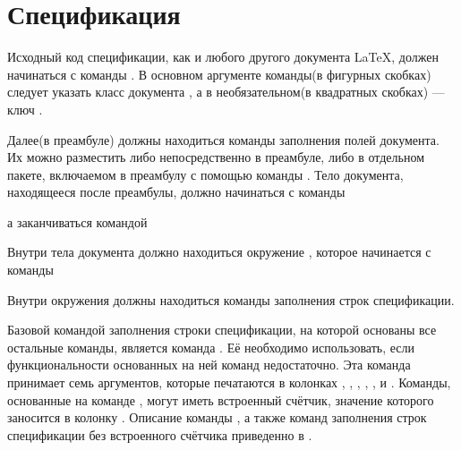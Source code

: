 
\section{Спецификация}

Исходный код спецификации, как и любого другого документа \LaTeX{}, должен
начинаться с команды . В основном аргументе
команды(в фигурных скобках) следует указать класс документа , а в
необязательном(в квадратных скобках) --- ключ .


Далее(в преамбуле) должны находиться команды заполнения полей документа. Их можно
разместить либо непосредственно в преамбуле, либо в отдельном пакете, включаемом в
преамбулу с помощью команды . Тело документа,
находящееся после преамбулы, должно начинаться с команды

\begin{pcbdoccode}

\end{pcbdoccode}

а заканчиваться командой

\begin{pcbdoccode}

\end{pcbdoccode}

Внутри тела документа должно находиться
окружение , которое начинается с команды

\begin{pcbdoccode}
\end{pcbdoccode}

Внутри окружения  должны находиться команды заполнения строк
спецификации.

Базовой командой заполнения строки спецификации, на которой основаны все ос\-таль\-ные
команды, является команда . Её необходимо использовать,
если функциональности основанных на ней команд недостаточно. Эта команда принимает семь
аргументов, которые печатаются в колонках
, ,
, ,
,  и
. Команды, основанные на
команде , могут иметь встроенный счётчик, значение которого
заносится в колонку . Описание команды
, а также команд заполнения строк спецификации без
встроенного счётчика приведенно в .\sloppy

